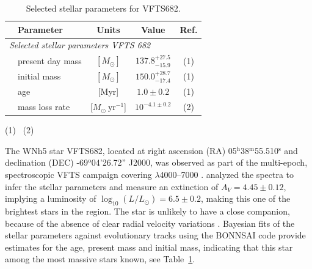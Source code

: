 \documentclass[apjl,twocolumn]{emulateapj}
\DeclareRobustCommand{\Tabref}[1]{Table~\ref{#1}}
\begin{document}
\begin{table}
  \begin{center}
    \caption{Selected stellar parameters for VFTS682. }
    \begin{tabular}{llc|c|c}
      \hline
      \hline
      &Parameter & Units & Value & Ref.\\
     
       \hline
       \multicolumn{5}{l}{\emph{Selected stellar parameters VFTS 682}}
      \\
      \hline
     & present day mass  & $[M_\odot]$ & $137.8^{+27.5}_
                                           {-15.9}$ & (1)
                                                    \\
      & initial mass& $[M_\odot]$ & $150.0^{+28.7}_{-17.4}$ & (1)
      \\
      &age & [Myr] & $1.0\pm0.2$ & (1) \\
      &mass loss rate & [$M_\odot \ \mathrm{yr}^{-1}$] & $10^{-4.1\pm0.2}$ & (2)\\
      \hline

    \end{tabular}
    \tablecomments
    { 
      (1)~\cite{schneider:18}
      (2)~\cite{bestenlehner:11}
    }
  \end{center}
  \label{tab:star_param}
\end{table}



The WNh5 star VFTS682, located at right ascension (RA)
05$^\mathrm{h}$38$^\mathrm{m}$55.510$^\mathrm{s}$  and declination
(DEC) \mbox{-69$^\mathrm{o}$04'26.72''} J2000, was observed as part of the multi-epoch, spectroscopic VFTS campaign covering $\lambda$4000--7000 \citep[][]{evans:11}. 
\citet{bestenlehner:11}  analyzed the spectra to infer the stellar
parameters and measure an extinction of $A_V=4.45\pm0.12$, implying a
luminosity of $\log_{10}(L/L_\odot) =  6.5\pm0.2$, making this one of
the brightest stars in the region. The star is unlikely to have a
close companion, because of the absence of clear radial velocity
variations \citet{bestenlehner:11}. Bayesian fits of the stellar
parameters against evolutionary tracks \citep{brott:11, kohler:15}
using the BONNSAI code \citep{schneider:17, schneider:18} provide
estimates for the age, present mass and initial mass, indicating that
this star among the most massive stars known, see
\Tabref{tab:star_param}. %
\end{document}
